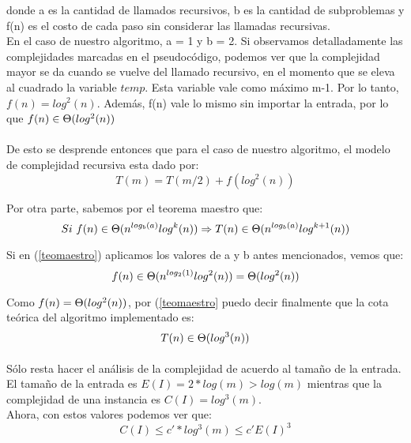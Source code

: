 {donde a es la cantidad de llamados recursivos, b es la cantidad de subproblemas y f(n) es el costo de cada paso sin considerar las llamadas recursivas.\\
En el caso de nuestro algoritmo, a = 1 y b = 2. Si observamos detalladamente las complejidades marcadas en el pseudocódigo, podemos ver que la complejidad mayor se da cuando se vuelve del llamado recursivo, en el momento que se eleva al cuadrado la variable $temp$. Esta variable vale como máximo m-1. Por lo tanto, $f(n) = log^{2}(n)$. Además, f(n) vale lo mismo sin importar la entrada, por lo que $f(n) \in \Theta(log^{2}(n))$

\paragraph{}
De esto se desprende entonces que para el caso de nuestro algoritmo, el modelo de complejidad recursiva esta dado por:
\begin{equation}
	T(m) = T(m/2) + f(log^{2}(n))
	\label{comprecursiva}
\end{equation}

Por otra parte, sabemos por el teorema maestro que:
\begin{equation}
	Si\ f(n) \in \Theta(n^{log_{b}(a)}log^{k}(n)) \Rightarrow T(n) \in \Theta(n^{log_{b}(a)}log^{k+1}(n))
	\label{teomaestro}
\end{equation}

Si en (\ref{teomaestro}) aplicamos los valores de a y b antes mencionados, vemos que:
\begin{equation}
	f(n) \in \Theta(n^{log_{2}(1)}log^{2}(n)) = \Theta(log^{2}(n))
	\label{compalgoritmo}
\end{equation}

Como $f(n) = \Theta(log^{2}(n))$, por (\ref{teomaestro} puedo decir finalmente que la cota teórica del algoritmo implementado es:
\begin{equation}
	T(n) \in \Theta(log^{3}(n))
	\label{teomaestro}
\end{equation}

\paragraph{}
Sólo resta hacer el análisis de la complejidad de acuerdo al tamaño de la entrada. El tamaño de la entrada es $E(I) = 2*log(m) > log(m)$ mientras que la complejidad de una instancia es $C(I) = log^{3}(m)$.\\
Ahora, con estos valores podemos ver que:
\begin{equation}
	C(I) \leq c' * log^{3}(m) \leq c' E(I)^{3}
\end{equation}

}
